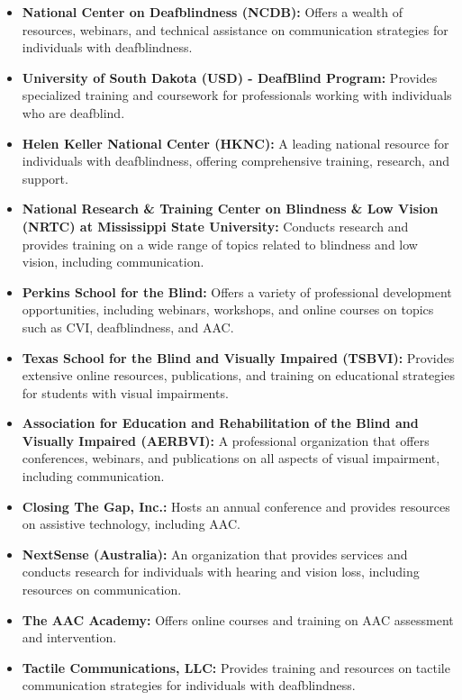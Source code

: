 \begin{itemize}
	\item \textbf{National Center on Deafblindness (NCDB):} Offers a wealth of resources, webinars, and technical assistance on communication strategies for individuals with deafblindness.
	\item \textbf{University of South Dakota (USD) - DeafBlind Program:} Provides specialized training and coursework for professionals working with individuals who are deafblind.
	\item \textbf{Helen Keller National Center (HKNC):} A leading national resource for individuals with deafblindness, offering comprehensive training, research, and support.
	\item \textbf{National Research \& Training Center on Blindness \& Low Vision (NRTC) at Mississippi State University:} Conducts research and provides training on a wide range of topics related to blindness and low vision, including communication.
	\item \textbf{Perkins School for the Blind:} Offers a variety of professional development opportunities, including webinars, workshops, and online courses on topics such as CVI, deafblindness, and AAC.
	\item \textbf{Texas School for the Blind and Visually Impaired (TSBVI):} Provides extensive online resources, publications, and training on educational strategies for students with visual impairments.
	\item \textbf{Association for Education and Rehabilitation of the Blind and Visually Impaired (AERBVI):} A professional organization that offers conferences, webinars, and publications on all aspects of visual impairment, including communication.
	\item \textbf{Closing The Gap, Inc.:} Hosts an annual conference and provides resources on assistive technology, including AAC.
	\item \textbf{NextSense (Australia):} An organization that provides services and conducts research for individuals with hearing and vision loss, including resources on communication.
	\item \textbf{The AAC Academy:} Offers online courses and training on AAC assessment and intervention.
	\item \textbf{Tactile Communications, LLC:} Provides training and resources on tactile communication strategies for individuals with deafblindness.
\end{itemize}


